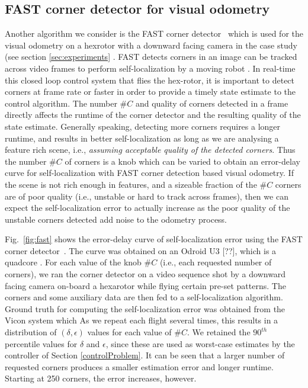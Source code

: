 \subsection{FAST corner detector for visual odometry}

Another algorithm we consider is the FAST corner detector~\cite{rosten_2006_machine} which is used for the visual odometry on a hexrotor with a downward facing camera in the case study (see section \ref{sec:experiments} .
FAST detects corners in an image can be tracked across video frames to perform self-localization by a moving robot \cite{}.
In real-time this closed loop control system that flies the hex-rotor, it is important to detect corners at frame rate or faster in order to provide a timely state estimate to the control algorithm.
The number $\#C$ and quality of corners detected in a frame directly affects the runtime of the corner detector and the resulting quality of the state estimate. Generally speaking, detecting more corners requires a longer runtime, and results in better self-localization as long as we are analysing a feature rich scene, i.e., \emph{assuming acceptable quality of the detected corners}. Thus the number $\#C$ of corners is a knob which can be varied to obtain an error-delay curve for self-localization with FAST corner detection based visual odometry.
If the scene is not rich enough in features, and a sizeable fraction of the $\#C$ corners are of poor quality (i.e., unstable or hard to track across frames), then we can expect the self-localization error to actually increase as the poor quality of the unstable corners detected add noise to the odometry process.


Fig.~\ref{fig:fast} shows the error-delay curve of self-localization error using the FAST corner detector~\cite{rosten_2006_machine}.
The curve was obtained on an Odroid U3 [??], which is a quadcore .
For each value of the knob $\#C$ (i.e., each requested number of corners), we ran the corner detector on a video sequence shot by a downward facing camera on-board a hexarotor while flying certain pre-set patterns.
The corners and some auxiliary data are then fed to a self-localization algorithm.
Ground truth for computing the self-localization error was obtained from the Vicon system which 
As we repeat each flight several times, this results in a distribution of $(\delta,\epsilon)$ values for each value of $\#C$.
We retained the $90^{th}$ percentile values for $\delta$ and $\epsilon$, since these are used as worst-case estimates by the controller of Section \ref{controlProblem}.
It can be seen that a larger number of requested corners produces a smaller estimation error and longer runtime.
Starting at 250 corners, the error increases, however.

